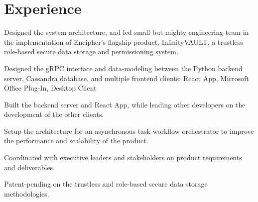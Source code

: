 \documentclass[a4paper]{deedy-resume-openfont} %
\begin{document}

\lastupdated %


\section{Experience}
\sectionheadersep


\begin{tightemize}
\item Designed the system architecture, and led small but mighty engineering team in the implementation of Encipher's flagship product, InfinityVAULT, a trustless role-based secure data storage and permissioning system.
\item Designed the gRPC interface and data-modeling between the Python backend server, Cassandra database, and multiple frontend clients: React App, Microsoft Office Plug-In, Desktop Client
\item Built the backend server and React App, while leading other developers on the development of the other clients. 
\item Setup the architecture for an asynchronous task workflow orchestrator to improve the performance and scalability of the product.
\item Coordinated with executive leaders and stakeholders on product requirements and deliverables.
\item Patent-pending on the trustless and role-based secure data storage methodologies.
\end{tightemize}

\sectionsep %

\end{document}
